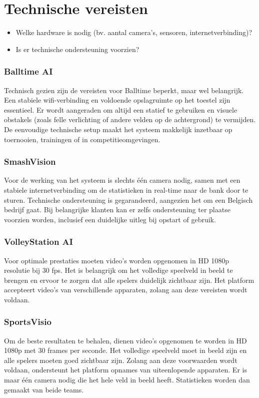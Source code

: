 \section{Technische vereisten}
\begin{itemize}
  \item Welke hardware is nodig (bv. aantal camera’s, sensoren, internetverbinding)?
  \item Is er technische ondersteuning voorzien?
\end{itemize}
\subsubsection{Balltime AI}
Technisch gezien zijn de vereisten voor Balltime beperkt, maar wel belangrijk. Een stabiele wifi-verbinding en voldoende opslagruimte op het toestel zijn essentieel. Er wordt aangeraden om altijd een statief te gebruiken en visuele obstakels (zoals felle verlichting of andere velden op de achtergrond) te vermijden. De eenvoudige technische setup maakt het systeem makkelijk inzetbaar op toernooien, trainingen of in competitieomgevingen.
\subsubsection{SmashVision}
Voor de werking van het systeem is slechts één camera nodig, samen met een stabiele internetverbinding om de statistieken in real-time naar de bank door te sturen. Technische ondersteuning is gegarandeerd, aangezien het om een Belgisch bedrijf gaat. Bij belangrijke klanten kan er zelfs ondersteuning ter plaatse voorzien worden, inclusief een duidelijke uitleg bij opstart of gebruik.
\subsubsection{VolleyStation AI}
Voor optimale prestaties moeten video's worden opgenomen in HD 1080p resolutie bij 30 fps. Het is belangrijk om het volledige speelveld in beeld te brengen en ervoor te zorgen dat alle spelers duidelijk zichtbaar zijn. Het platform accepteert video's van verschillende apparaten, zolang aan deze vereisten wordt voldaan. 
\subsubsection{SportsVisio}
Om de beste resultaten te behalen, dienen video's opgenomen te worden in HD 1080p met 30 frames per seconde. Het volledige speelveld moet in beeld zijn en alle spelers moeten goed zichtbaar zijn. Zolang aan deze voorwaarden wordt voldaan, ondersteunt het platform opnames van uiteenlopende apparaten. Er is maar één camera nodig die het hele veld in beeld heeft. Statistieken worden dan gemaakt van beide teams.

